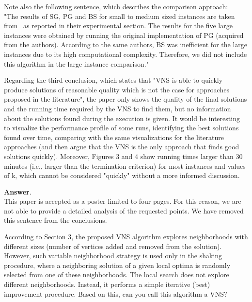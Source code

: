 \documentclass [11pt]{scrartcl}
\begin{document}
\begin{enumerate}
	Note also the following sentence, which describes the comparison approach:\\
	"The results of SG, PG and BS for small to medium sized instances are taken from~\cite{corcoran2021heuristics} as reported in their experimental section. The results for the five large instances were obtained by running the original implementation of PG (acquired from the authors). According to the same authors, BS was inefficient for the large instances due to its high computational complexity. Therefore, we did not include this algorithm in the large instance comparison."
	
	\textbf{Answer}. \\
	This paper is accepted as a poster limited to four pages. For this reason, we are not able to provide a detailed analysis of the requested points. We have removed this sentence from the conclusions. 
\end{enumerate}

\begin{leftbar}	
According to Section 3, the proposed VNS algorithm explores neighborhoods with different sizes (number of vertices added and removed from the solution). However, such variable neighborhood strategy is used only in the shaking procedure, where a neighboring solution of a given local optima is randomly selected from one of these neighborhoods. The local search does not explore different neighborhoods. Instead, it performs a simple iterative (best) improvement procedure. Based on this, can you call this algorithm a VNS?
\end{leftbar}
\end{document}
